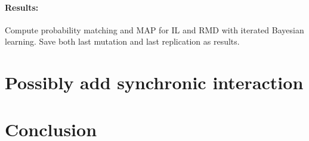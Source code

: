 \documentclass[12pt]{article}
\begin{document}
\paragraph{Results:} Compute probability matching and MAP for IL and RMD with iterated Bayesian learning. Save both last mutation and last replication as results.

\section{Possibly add synchronic interaction}

\section{Conclusion}






\end{document}
